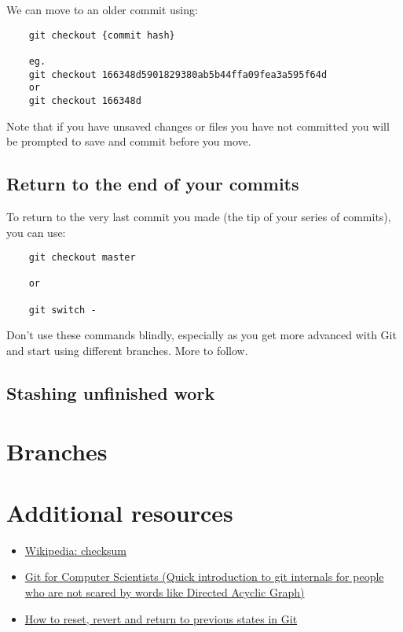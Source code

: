 We can move to an older commit using:

\begin{verbatim}
    git checkout {commit hash}

    eg.
    git checkout 166348d5901829380ab5b44ffa09fea3a595f64d
    or
    git checkout 166348d
\end{verbatim}

Note that if you have unsaved changes or files you have not committed you will be prompted to save and commit before you move.
\\

\subsection{Return to the end of your commits}

To return to the very last commit you made (the tip of your series of commits), you can use:

\begin{verbatim}
    git checkout master

    or

    git switch -
\end{verbatim}

Don't use these commands blindly, especially as you get more advanced with Git and start using different branches. More to follow.


\subsection{Stashing unfinished work}


\section{Branches}

\section{Additional resources}

\begin{itemize}[leftmargin=*]
    \item \href{https://en.wikipedia.org/wiki/Checksum}{Wikipedia: checksum}
	\item \href{https://eagain.net/articles/git-for-computer-scientists/}{Git for Computer Scientists (Quick introduction to git internals for people who are not scared by words like Directed Acyclic Graph)}
	\item \href{https://opensource.com/article/18/6/git-reset-revert-rebase-commands}{How to reset, revert and return to previous states in Git}

\end{itemize}



